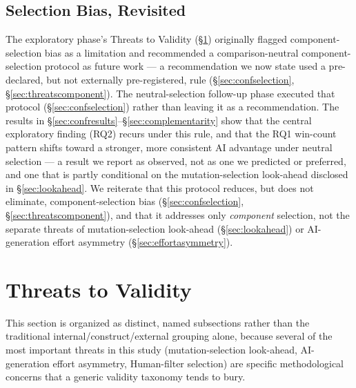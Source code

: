 \documentclass[10pt,conference]{IEEEtran}
\begin{document}
\subsection{Selection Bias, Revisited}
The exploratory phase's Threats to Validity (\S\ref{sec:threats}) originally flagged component-selection bias as a limitation and recommended a comparison-neutral component-selection protocol as future work — a recommendation we now state used a pre-declared, but not externally pre-registered, rule (\S\ref{sec:confselection}, \S\ref{sec:threatscomponent}). The neutral-selection follow-up phase executed that protocol (\S\ref{sec:confselection}) rather than leaving it as a recommendation. The results in \S\ref{sec:confresults}--\S\ref{sec:complementarity} show that the central exploratory finding (RQ2) recurs under this rule, and that the RQ1 win-count pattern shifts toward a stronger, more consistent AI advantage under neutral selection — a result we report as observed, not as one we predicted or preferred, and one that is partly conditional on the mutation-selection look-ahead disclosed in \S\ref{sec:lookahead}. We reiterate that this protocol reduces, but does not eliminate, component-selection bias (\S\ref{sec:confselection}, \S\ref{sec:threatscomponent}), and that it addresses only \emph{component} selection, not the separate threats of mutation-selection look-ahead (\S\ref{sec:lookahead}) or AI-generation effort asymmetry (\S\ref{sec:effortasymmetry}).

\section{Threats to Validity}
\label{sec:threats}
This section is organized as distinct, named subsections rather than the traditional internal/construct/external grouping alone, because several of the most important threats in this study (mutation-selection look-ahead, AI-generation effort asymmetry, Human-filter selection) are specific methodological concerns that a generic validity taxonomy tends to bury.
\end{document}
